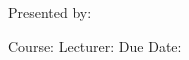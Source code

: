 \documentclass[document.tex]{subfiles}
\begin{document}
\clearpage\thispagestyle{empty}
\makeatletter
\begin{center}
\textbf{\huge\papertype}
\linebreak\linebreak
\textit{\@title}
\linebreak\linebreak\linebreak\linebreak\linebreak\linebreak\linebreak
\end{center}
\begin{flushleft}
Presented by:\linebreak
\@author\linebreak
\address\linebreak
\linebreak\linebreak\linebreak\linebreak\linebreak
Course: \course\linebreak
Lecturer: \lecturer\linebreak
Due Date: \@date
\end{flushleft}
\newpage
\end{document}
